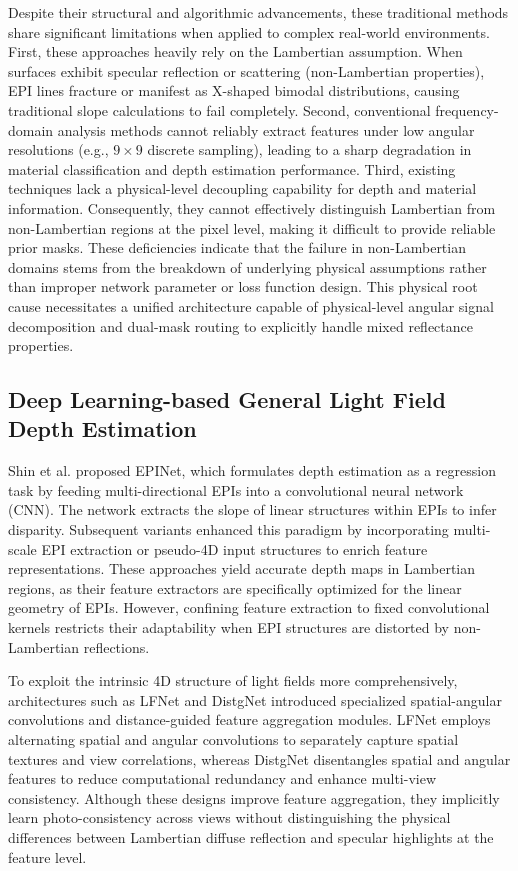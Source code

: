 \documentclass[lettersize,journal]{IEEEtran}
\begin{document}
Despite their structural and algorithmic advancements, these traditional methods share significant limitations when applied to complex real-world environments. First, these approaches heavily rely on the Lambertian assumption. When surfaces exhibit specular reflection or scattering (non-Lambertian properties), EPI lines fracture or manifest as X-shaped bimodal distributions, causing traditional slope calculations to fail completely. Second, conventional frequency-domain analysis methods cannot reliably extract features under low angular resolutions (e.g., $9 \times 9$ discrete sampling), leading to a sharp degradation in material classification and depth estimation performance. Third, existing techniques lack a physical-level decoupling capability for depth and material information. Consequently, they cannot effectively distinguish Lambertian from non-Lambertian regions at the pixel level, making it difficult to provide reliable prior masks. These deficiencies indicate that the failure in non-Lambertian domains stems from the breakdown of underlying physical assumptions rather than improper network parameter or loss function design. This physical root cause necessitates a unified architecture capable of physical-level angular signal decomposition and dual-mask routing to explicitly handle mixed reflectance properties.

\subsection{Deep Learning-based General Light Field Depth Estimation}

Shin et al. \cite{vaswani2017} proposed EPINet, which formulates depth estimation as a regression task by feeding multi-directional EPIs into a convolutional neural network (CNN). The network extracts the slope of linear structures within EPIs to infer disparity. Subsequent variants enhanced this paradigm by incorporating multi-scale EPI extraction or pseudo-4D input structures to enrich feature representations. These approaches yield accurate depth maps in Lambertian regions, as their feature extractors are specifically optimized for the linear geometry of EPIs. However, confining feature extraction to fixed convolutional kernels restricts their adaptability when EPI structures are distorted by non-Lambertian reflections.

To exploit the intrinsic 4D structure of light fields more comprehensively, architectures such as LFNet \cite{he2016} and DistgNet introduced specialized spatial-angular convolutions and distance-guided feature aggregation modules. LFNet employs alternating spatial and angular convolutions to separately capture spatial textures and view correlations, whereas DistgNet disentangles spatial and angular features to reduce computational redundancy and enhance multi-view consistency. Although these designs improve feature aggregation, they implicitly learn photo-consistency across views without distinguishing the physical differences between Lambertian diffuse reflection and specular highlights at the feature level.
\end{document}
